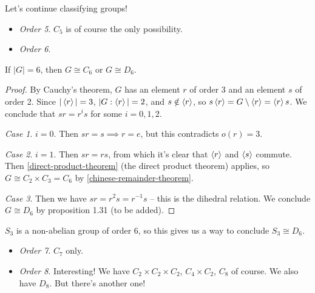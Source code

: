 \documentclass{../template/note}
\begin{document}
    Let's continue classifying groups!

    \begin{itemize}
        \item \emph{Order 5}. \(C_5\) is of course the only possibility.
        \item \emph{Order 6}.
    \end{itemize}
    
    \begin{lemma}
        If \(|G| = 6\), then \(G \cong C_6\) or \(G \cong D_6\).
    \end{lemma}
    
    \begin{proof}
        By Cauchy's theorem, \(G\) has an element \(r\) of order 3 and an element \(s\) of order 2. Since \(|\left \langle r \right \rangle| = 3\), \(|G:\left \langle r \right \rangle| = 2\), and \(s \notin \left \langle r \right \rangle\), so \(s \left \langle r \right \rangle = G \setminus \left \langle r \right \rangle = \left \langle r \right \rangle s\). We conclude that \(sr = r^is\) for some \(i = 0, 1, 2\).

        \emph{Case 1}. \(i = 0\). Then \(sr = s \implies r = e\), but this contradicts \(o(r) = 3\).

        \emph{Case 2}. \(i = 1\). Then \(sr = rs\), from which it's clear that \(\left \langle r \right \rangle\) and \(\left \langle s \right \rangle\) commute. Then \cref{direct-product-theorem} (the direct product theorem) applies, so \(G \cong C_2 \times C_3 = C_6\) by \cref{chinese-remainder-theorem}.

        \emph{Case 3}. Then we have \(sr = r^2s = r^{-1}s\) -- this is the dihedral relation. We conclude \(G \cong D_6\) by proposition 1.31 (to be added).
    \end{proof}
    
    \begin{remark*}
        \(S_3\) is a non-abelian group of order 6, so this gives us a way to conclude \(S_3 \cong D_6\).
    \end{remark*}

    
    \begin{itemize}
        \item \emph{Order 7}. \(C_7\) only.
        \item \emph{Order 8}. Interesting! We have \(C_2 \times C_2 \times C_2\), \(C_4 \times C_2\), \(C_8\) of course. We also have \(D_8\). But there's another one!
    \end{itemize}
    
\end{document}
